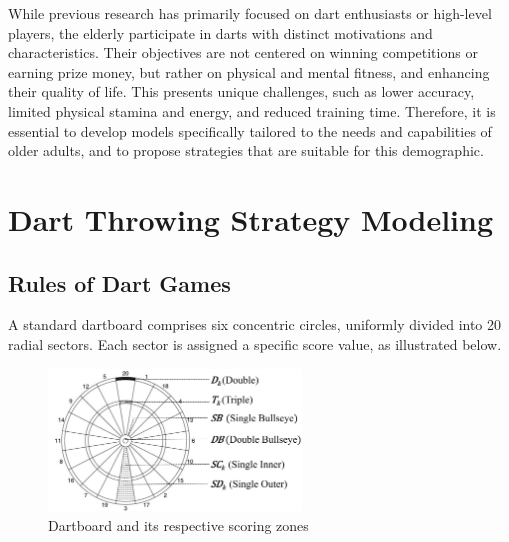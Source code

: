 \documentclass[cjjs]{ipart}
\theoremstyle{plain}
\begin{document}
While previous research has primarily focused on dart enthusiasts or high-level players, the elderly participate in darts with distinct motivations and characteristics. Their objectives are not centered on winning competitions or earning prize money, but rather on physical and mental fitness, and enhancing their quality of life. This presents unique challenges, such as lower accuracy, limited physical stamina and energy, and reduced training time. Therefore, it is essential to develop models specifically tailored to the needs and capabilities of older adults, and to propose strategies that are suitable for this demographic.


\section{Dart Throwing Strategy Modeling}

\subsection{Rules of Dart Games}
A standard dartboard comprises six concentric circles, uniformly divided into 20 radial sectors. Each sector is assigned a specific score value, as illustrated below.


\begin{figure}
        \centering
        \includegraphics[width=0.60\textwidth]{1.png}
        \caption{Dartboard and its respective scoring zones}
        \label{fig:enter-label}
     \label{fig:dartboard}
\end{figure}
\end{document}
